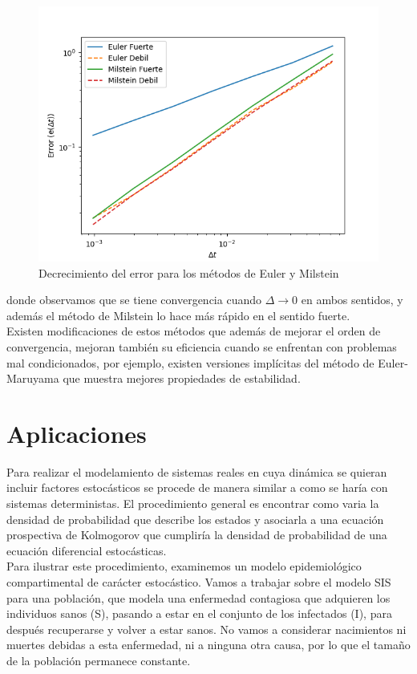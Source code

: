 \documentclass{article}
\begin{document}
\begin{figure}[H]
    \centering
    \includegraphics[width=\textwidth]{Convergencia.png}
    \caption{Decrecimiento del error para los métodos de Euler y Milstein}
    \label{fig:my_label}
\end{figure}
donde observamos que se tiene convergencia cuando $\Delta \to 0$ en ambos sentidos, y además el método de Milstein lo hace más rápido en el sentido fuerte.\\

\noindent
Existen modificaciones de estos métodos que además de mejorar el orden de convergencia, mejoran también su eficiencia cuando se enfrentan con problemas mal condicionados, por ejemplo, existen versiones implícitas del método de Euler-Maruyama que muestra mejores propiedades de estabilidad.

\section{Aplicaciones}
Para realizar el modelamiento de sistemas reales en cuya dinámica se  quieran incluir factores estocásticos se procede de manera similar a como se haría con sistemas deterministas. El procedimiento general es encontrar como varia la densidad de probabilidad que describe los estados y asociarla a una ecuación prospectiva de Kolmogorov que cumpliría la densidad de probabilidad de una ecuación diferencial estocásticas.\\

\noindent
Para ilustrar este procedimiento, examinemos un modelo epidemiológico compartimental de carácter estocástico. Vamos a trabajar sobre el modelo SIS para una población, que modela una enfermedad contagiosa que adquieren los individuos sanos (S), pasando a estar en el conjunto de los infectados (I), para después recuperarse y volver a estar sanos. No vamos a considerar nacimientos ni muertes debidas a esta enfermedad, ni a ninguna otra causa, por lo que el tamaño de la población permanece constante. \\
\end{document}
